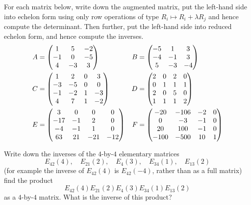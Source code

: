 \documentclass{article}
\begin{document}
\begin{Exercise}\label{exr:invech}
For each matrix below, write down the augmented matrix, put the
left-hand side into echelon form using only row operations of type
\(R_i\mapsto R_i+\lambda R_j\) and hence compute the
determinant. Then further, put the left-hand side into reduced
echelon form, and hence compute the inverses.
\begin{align*}
A&=\begin{pmatrix} 1 & 5 & -2 \\ -1 & 0 & -5 \\ 4 & -3 & 3 \end{pmatrix}&
B&=\begin{pmatrix} -5 & 1 & 3 \\ -4 & -1 & 3 \\ 5 & -3 & -4 \end{pmatrix} \\
C&=\begin{pmatrix} 1 & 2 & 0 & 3 \\ -3 & -5 & 0 & 0 \\ -1 & -2 & 1 & -3 \\ 4 & 7 & 1 & -2\end{pmatrix}&
D&=\begin{pmatrix} 2 & 0 & 2 & 0 \\ 0 & 1 & 1 & 1\\ 2 & 0 & 5 & 0 \\ 1 & 1 & 1 & 2\end{pmatrix}\\
E&=\begin{pmatrix} 3 & 0 & 0 & 0 \\ -17 & -1 & 2 & 0 \\ -4 & -1 & 1 & 0 \\ 63 & 21 & -21 & -12\end{pmatrix}&
F&=\begin{pmatrix} -20 & -106 & -2 & 0 \\ 0 & -3 & -1 & 0 \\ 20 & 100 & -1 & 0 \\ -100 & -500 & 10 & 1 \end{pmatrix}
\end{align*}


\end{Exercise}
\begin{Exercise}\label{exr:elem}
Write down the inverses of the \(4\)-by-\(4\) elementary matrices
\[E_{42}(4),\quad E_{21}(2),\quad E_{4}(3),\quad E_{34}(1),\quad
E_{13}(2)\] (for example the inverse of \(E_{42}(4)\) is
\(E_{42}(-4)\), rather than as a full matrix) find the product
\[E_{42}(4)E_{21}(2)E_4(3)E_{34}(1)E_{13}(2)\] as a \(4\)-by-\(4\)
matrix. What is the inverse of this product?


\end{Exercise}
\end{document}

